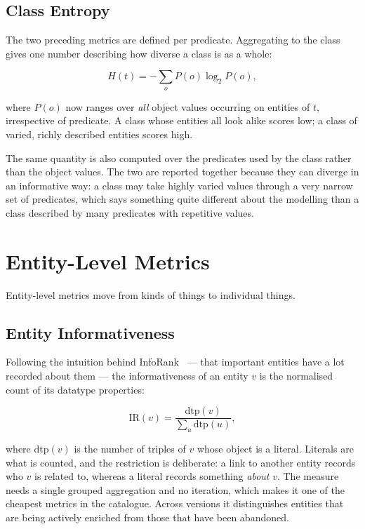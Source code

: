 \subsection{Class Entropy}

The two preceding metrics are defined per predicate. Aggregating to the class
gives one number describing how diverse a class is as a whole:

\begin{equation}
  H(t) = - \sum_{o} P(o) \log_2 P(o),
  \label{eq:class_entropy}
\end{equation}

where $P(o)$ now ranges over \emph{all} object values occurring on entities of
$t$, irrespective of predicate. A class whose entities all look alike scores low;
a class of varied, richly described entities scores high.

The same quantity is also computed over the predicates used by the class rather
than the object values. The two are reported together because they can diverge in
an informative way: a class may take highly varied values through a very narrow
set of predicates, which says something quite different about the modelling than
a class described by many predicates with repetitive values.

\section{Entity-Level Metrics}
\label{sec:entity_level_metrics}

Entity-level metrics move from kinds of things to individual things.

\subsection{Entity Informativeness}

Following the intuition behind InfoRank~\cite{menendez2018ranking} --- that
important entities have a lot recorded about them --- the informativeness of an
entity $v$ is the normalised count of its datatype properties:

\begin{equation}
  \mathrm{IR}(v) = \frac{\mathrm{dtp}(v)}{\sum_{u} \mathrm{dtp}(u)},
  \label{eq:inforank}
\end{equation}

where $\mathrm{dtp}(v)$ is the number of triples of $v$ whose object is a
literal. Literals are what is counted, and the restriction is deliberate: a link
to another entity records who $v$ is related to, whereas a literal records
something \emph{about} $v$. The measure needs a single grouped aggregation and no
iteration, which makes it one of the cheapest metrics in the catalogue. Across
versions it distinguishes entities that are being actively enriched from those
that have been abandoned.

